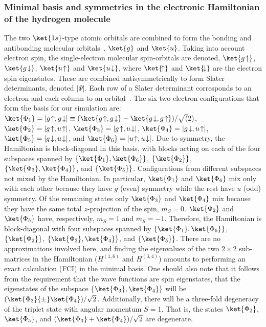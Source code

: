 \documentclass[11pt,oneside,final]{huthesis}%
\begin{document}
\subsubsection{Minimal basis and symmetries in the electronic Hamiltonian of the hydrogen molecule}

The two $\ket{1s}$-type atomic orbitals are combined to form the bonding and antibonding 
molecular orbitals~\cite{Szabo96},
$\ket{g}$ and $\ket{u}$. Taking into account electron spin, the single-electron molecular spin-orbitals are denoted,
$\ket{g \! \uparrow}$,
$\ket{g \! \downarrow}$,
$\ket{u \! \uparrow}$ and
$\ket{u \! \downarrow}$,
where $\ket{\! \uparrow}$ and $\ket{\! \downarrow}$ are the electron spin
eigenstates. These are combined antisymmetrically to form Slater determinants, 
denoted $|\Psi|$. Each row of a Slater 
determinant corresponds to an electron and each column to an orbital~\cite{Szabo96}. 
The six two-electron configurations that form the basis for our simulation are:
$\ket{\Phi_1}=\left|g \! \uparrow, g \! \downarrow \right| \equiv (\ket{g \! \uparrow, g \! \downarrow}-\ket{g 
\! \downarrow,g \! \uparrow})/\sqrt(2)$,
$\ket{\Phi_2}=\left|g \! \uparrow, u \! \uparrow \right|$,
$\ket{\Phi_3}= \left |g \! \uparrow, u \! \downarrow \right|$,
$\ket{\Phi_4}= \left |g \! \downarrow, u \! \uparrow \right|$,
$\ket{\Phi_5}= \left |g \! \downarrow, u \! \downarrow \right|$, and
$\ket{\Phi_6}= \left |u \! \uparrow, u \! \downarrow \right|$. 
Due to symmetry, the Hamiltonian is block-diagonal in this basis, with blocks acting on each of 
the four subspaces spanned by
$\{\ket{\Phi_1},\ket{\Phi_6}\}$, $\{\ket{\Phi_2}\}$,
$\{\ket{\Phi_3},\ket{\Phi_4}\}$, and $\{\ket{\Phi_5}\}$. 
Configurations from different subspaces not mixed by the Hamiltonian. In particular, 
$\ket{\Phi_1}$ and $\ket{\Phi_6}$ mix only with each other because they have $g$ (even) symmetry 
while the rest have $u$ (odd) symmetry.   Of the remaining states only $\ket{\Phi_3}$ and 
$\ket{\Phi_4}$ mix because they have the same total $z$-projection of the spin, $m_S=0$. 
$\ket{\Phi_2}$ and $\ket{\Phi_5}$ have, respectively, $m_S=1$ and $m_S=-1$. Therefore, the 
Hamiltonian is block-diagonal with four subspaces spanned by
$\{\ket{\Phi_1},\ket{\Phi_6}\}$, $\{\ket{\Phi_2}\}$, $\{\ket{\Phi_3},\ket{\Phi_4}\}$, and
$\{\ket{\Phi_5}\}$. There are no approximations involved here, and finding the eigenvalues of the 
two $2{\times}2$ sub-matrices in the Hamiltonian (${H}^{(1,6)}$ and ${H}^{(3,4)}$) 
amounts
to performing an exact calculation (FCI) in the minimal basis. One should also note that it follows 
from the requirement that the wave functions are spin eigenstates, that the eigenstates of the 
subspace $\{\ket{\Phi_3},\ket{\Phi_4}\}$ will be $(\ket{\Phi_3} {\pm} \ket{\Phi_4})/\sqrt{2}$. 
Additionally, there will be a three-fold degeneracy of the triplet state with angular momentum 
$S=1$. That is, the states $\ket{\Phi_2}$, $\ket{\Phi_5}$, and $(\ket{\Phi_3}+\ket{\Phi_4})/\sqrt{2}$
are degenerate.
\end{document}
